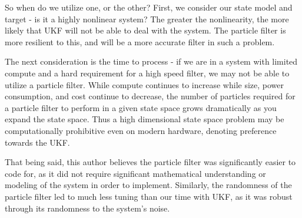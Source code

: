 \documentclass{article}
\begin{document}
So when do we utilize one, or the other? First, we consider our state model and target - is it a highly nonlinear system? The greater the nonlinearity, the more likely that UKF will not be able to deal with the system. The particle filter is more resilient to this, and will be a more accurate filter in such a problem.

The next consideration is the time to process - if we are in a system with limited compute and a hard requirement for a high speed filter, we may not be able to utilize a particle filter. While compute continues to increase while size, power consumption, and cost continue to decrease, the number of particles required for a particle filter to perform in a given state space grows dramatically as you expand the state space. Thus a high dimensional state space problem may be computationally prohibitive even on modern hardware, denoting preference towards the UKF.

That being said, this author believes the particle filter was significantly easier to code for, as it did not require significant mathematical understanding or modeling of the system in order to implement. Similarly, the randomness of the particle filter led to much less tuning than our time with UKF, as it was robust through its randomness to the system's noise.
\end{document}
